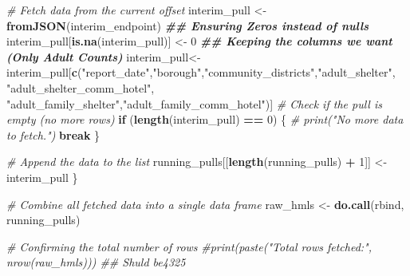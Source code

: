 \documentclass[
]{article}
\newenvironment{Shaded}{\begin{snugshade}}{\end{snugshade}}
\newcommand{\CommentTok}[1]{\textcolor[rgb]{0.56,0.35,0.01}{\textit{#1}}}
\newcommand{\ControlFlowTok}[1]{\textcolor[rgb]{0.13,0.29,0.53}{\textbf{#1}}}
\newcommand{\DecValTok}[1]{\textcolor[rgb]{0.00,0.00,0.81}{#1}}
\newcommand{\DocumentationTok}[1]{\textcolor[rgb]{0.56,0.35,0.01}{\textbf{\textit{#1}}}}
\newcommand{\FunctionTok}[1]{\textcolor[rgb]{0.13,0.29,0.53}{\textbf{#1}}}
\newcommand{\NormalTok}[1]{#1}
\newcommand{\OtherTok}[1]{\textcolor[rgb]{0.56,0.35,0.01}{#1}}
\newcommand{\SpecialCharTok}[1]{\textcolor[rgb]{0.81,0.36,0.00}{\textbf{#1}}}
\newcommand{\StringTok}[1]{\textcolor[rgb]{0.31,0.60,0.02}{#1}}
\begin{document}
\begin{Shaded}
\begin{Highlighting}[]
  \CommentTok{\# Fetch data from the current offset}
\NormalTok{  interim\_pull }\OtherTok{\textless{}{-}} \FunctionTok{fromJSON}\NormalTok{(interim\_endpoint)}
  \DocumentationTok{\#\# Ensuring Zeros instead of nulls}
\NormalTok{  interim\_pull[}\FunctionTok{is.na}\NormalTok{(interim\_pull)] }\OtherTok{\textless{}{-}} \DecValTok{0}
  \DocumentationTok{\#\# Keeping the columns we want (Only Adult Counts)}
\NormalTok{  interim\_pull}\OtherTok{\textless{}{-}}\NormalTok{interim\_pull[}\FunctionTok{c}\NormalTok{(}\StringTok{"report\_date"}\NormalTok{,}\StringTok{"borough"}\NormalTok{,}\StringTok{"community\_districts"}\NormalTok{,}\StringTok{"adult\_shelter"}\NormalTok{,}
                 \StringTok{"adult\_shelter\_comm\_hotel"}\NormalTok{, }\StringTok{"adult\_family\_shelter"}\NormalTok{,}\StringTok{"adult\_family\_comm\_hotel"}\NormalTok{)]}
  \CommentTok{\# Check if the pull is empty (no more rows)}
  \ControlFlowTok{if}\NormalTok{ (}\FunctionTok{length}\NormalTok{(interim\_pull) }\SpecialCharTok{==} \DecValTok{0}\NormalTok{) \{}
    \CommentTok{\# print("No more data to fetch.")}
    \ControlFlowTok{break}
\NormalTok{  \}}
  
  \CommentTok{\# Append the data to the list}
\NormalTok{  running\_pulls[[}\FunctionTok{length}\NormalTok{(running\_pulls) }\SpecialCharTok{+} \DecValTok{1}\NormalTok{]] }\OtherTok{\textless{}{-}}\NormalTok{ interim\_pull}
\NormalTok{\}}

\CommentTok{\# Combine all fetched data into a single data frame}
\NormalTok{raw\_hmls }\OtherTok{\textless{}{-}} \FunctionTok{do.call}\NormalTok{(rbind, running\_pulls)}

\CommentTok{\# Confirming the total number of rows}
 \CommentTok{\#print(paste("Total rows fetched:", nrow(raw\_hmls))) \#\# Shuld be4325}


\end{Highlighting}
\end{Shaded}
\end{document}
